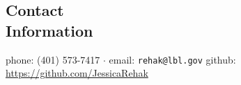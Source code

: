 \documentclass[margin,line]{resume}
\begin{document}
\begin{resume}
  \section{\mysidestyle Contact\\Information}
  phone: (401) 573-7417 $\cdot$ email: \verb`rehak@lbl.gov`\newline
  github: \url{https://github.com/JessicaRehak}\hfill \\


\end{resume}
\end{document}
